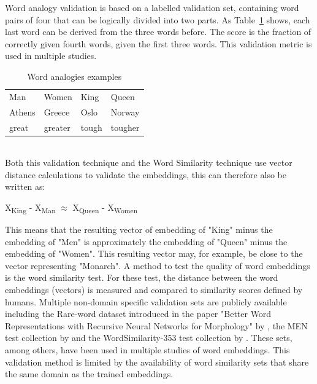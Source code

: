 \documentclass[../../Thesis.tex]{subfiles}
\begin{document}
\begin{jumpin}
Word analogy validation is based on a labelled validation set, containing word pairs of four that can be logically divided into two parts. As Table~\ref{table:wordAnalogies} shows, each last word can be derived from the three words before. The score is the fraction of correctly given fourth words, given the first three words. This validation metric is used in multiple studies\cite{mikolov2013distributed, mikolov2013efficient, dai2015document, pennington2014glove}.\\
\begin{table}[hbt]
\begin{center}
\begin{tabular}{l l l l}
Man & Women & King & Queen \\
Athens & Greece & Oslo & Norway\\
great & greater & tough & tougher
\end{tabular}
\end{center}
\caption{Word analogies examples}\label{table:wordAnalogies}
\end{table}\\
Both this validation technique and the Word Similarity technique use vector distance calculations to validate the embeddings, this can therefore also be written as:
\begin{displayquote}
    X\textsubscript{King} - X\textsubscript{Man} $\approx$  X\textsubscript{Queen} - X\textsubscript{Women}
\end{displayquote}
This means that the resulting vector of embedding of "King" minus the embedding of "Men" is approximately the embedding of "Queen" minus the embedding of "Women". This resulting vector may, for example, be close to the vector representing "Monarch".
A method to test the quality of word embeddings is the word similarity test. For these test, the distance between the word embeddings (vectors) is measured and compared to similarity scores defined by humans. Multiple non-domain specific validation sets are publicly available including the Rare-word dataset introduced in the paper "Better Word Representations with Recursive Neural Networks for Morphology" by \citet{luong2013better}, 
the MEN test collection by \citet{EBruniMENCollection} and the WordSimilarity-353 test collection by \citet{EGabrilovichWScollection}.
These sets, among others, have been used in multiple studies of word embeddings\cite{pennington2014glove, mikolov2013efficient}. This validation method is limited by the availability of word similarity sets that share the same domain as the trained embeddings.

\end{jumpin}
\end{document}
